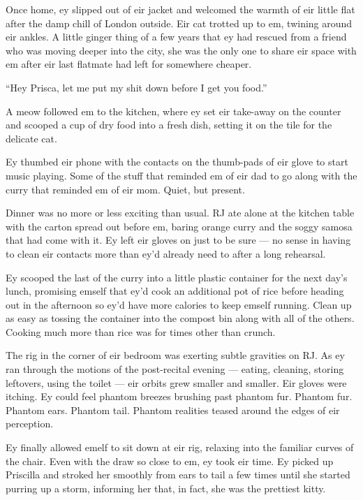 Once home, ey slipped out of eir jacket and welcomed the warmth of eir little flat after the damp chill of London outside. Eir cat trotted up to em, twining around eir ankles. A little ginger thing of a few years that ey had rescued from a friend who was moving deeper into the city, she was the only one to share eir space with em after eir last flatmate had left for somewhere cheaper.

``Hey Prisca, let me put my shit down before I get you food.''

A meow followed em to the kitchen, where ey set eir take-away on the counter and scooped a cup of dry food into a fresh dish, setting it on the tile for the delicate cat.

Ey thumbed eir phone with the contacts on the thumb-pads of eir glove to start music playing. Some of the stuff that reminded em of eir dad to go along with the curry that reminded em of eir mom. Quiet, but present.

Dinner was no more or less exciting than usual. RJ ate alone at the kitchen table with the carton spread out before em, baring orange curry and the soggy samosa that had come with it. Ey left eir gloves on just to be sure --- no sense in having to clean eir contacts more than ey'd already need to after a long rehearsal.

Ey scooped the last of the curry into a little plastic container for the next day's lunch, promising emself that ey'd cook an additional pot of rice before heading out in the afternoon so ey'd have more calories to keep emself running. Clean up as easy as tossing the container into the compost bin along with all of the others. Cooking much more than rice was for times other than crunch.

The rig in the corner of eir bedroom was exerting subtle gravities on RJ. As ey ran through the motions of the post-recital evening --- eating, cleaning, storing leftovers, using the toilet --- eir orbits grew smaller and smaller. Eir gloves were itching. Ey could feel phantom breezes brushing past phantom fur. Phantom fur. Phantom ears. Phantom tail. Phantom realities teased around the edges of eir perception.

Ey finally allowed emelf to sit down at eir rig, relaxing into the familiar curves of the chair. Even with the draw so close to em, ey took eir time. Ey picked up Priscilla and stroked her smoothly from ears to tail a few times until she started purring up a storm, informing her that, in fact, she was the prettiest kitty.

